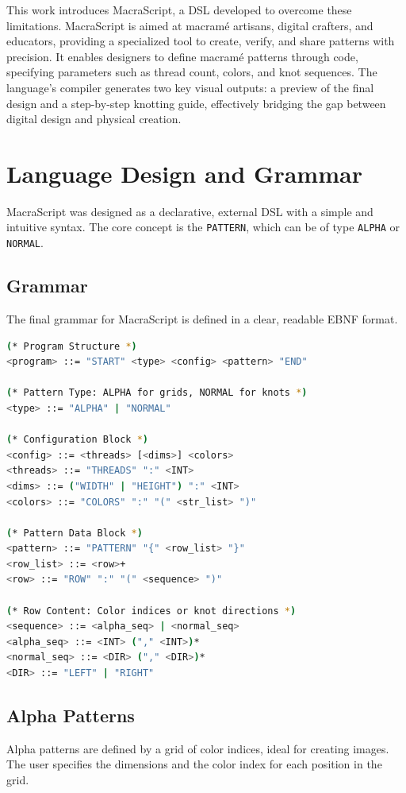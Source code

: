 \documentclass[conference]{IEEEtran}
\begin{document}
This work introduces MacraScript, a DSL developed to overcome these limitations. MacraScript is aimed at macramé artisans, digital crafters, and educators, providing a specialized tool to create, verify, and share patterns with precision. It enables designers to define macramé patterns through code, specifying parameters such as thread count, colors, and knot sequences. The language's compiler generates two key visual outputs: a preview of the final design and a step-by-step knotting guide, effectively bridging the gap between digital design and physical creation.

\section{Language Design and Grammar}
MacraScript was designed as a declarative, external DSL with a simple and intuitive syntax. The core concept is the \texttt{PATTERN}, which can be of type \texttt{ALPHA} or \texttt{NORMAL}.

\subsection{Grammar}
The final grammar for MacraScript is defined in a clear, readable EBNF format.

\begin{lstlisting}[language=bash, caption={Final EBNF Grammar for MacraScript}, basicstyle=\ttfamily\small]
(* Program Structure *)
<program> ::= "START" <type> <config> <pattern> "END"

(* Pattern Type: ALPHA for grids, NORMAL for knots *)
<type> ::= "ALPHA" | "NORMAL"

(* Configuration Block *)
<config> ::= <threads> [<dims>] <colors>
<threads> ::= "THREADS" ":" <INT>
<dims> ::= ("WIDTH" | "HEIGHT") ":" <INT>
<colors> ::= "COLORS" ":" "(" <str_list> ")"

(* Pattern Data Block *)
<pattern> ::= "PATTERN" "{" <row_list> "}"
<row_list> ::= <row>+
<row> ::= "ROW" ":" "(" <sequence> ")"

(* Row Content: Color indices or knot directions *)
<sequence> ::= <alpha_seq> | <normal_seq>
<alpha_seq> ::= <INT> ("," <INT>)*
<normal_seq> ::= <DIR> ("," <DIR>)*
<DIR> ::= "LEFT" | "RIGHT"
\end{lstlisting}

\subsection{Alpha Patterns}
Alpha patterns are defined by a grid of color indices, ideal for creating images. The user specifies the dimensions and the color index for each position in the grid.
\end{document}
